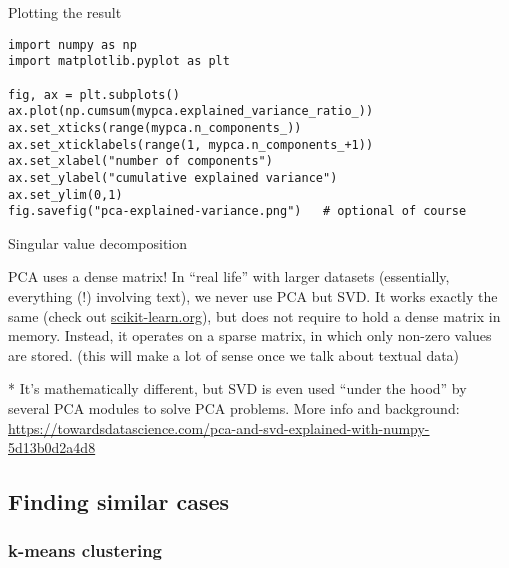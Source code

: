 \begin{frame}{Plotting the result}
  \begin{verbatim}
import numpy as np
import matplotlib.pyplot as plt

fig, ax = plt.subplots()
ax.plot(np.cumsum(mypca.explained_variance_ratio_))
ax.set_xticks(range(mypca.n_components_))
ax.set_xticklabels(range(1, mypca.n_components_+1))
ax.set_xlabel("number of components") 
ax.set_ylabel("cumulative explained variance") 
ax.set_ylim(0,1)
fig.savefig("pca-explained-variance.png")   # optional of course
\end{verbatim}


\end{frame}






\begin{frame}{Singular value decomposition}

\begin{alertblock}{PCA uses a dense matrix!}
In ``real life'' with larger datasets (essentially, everything (!) involving text), we never use PCA but SVD. It works exactly the same (check out \url{scikit-learn.org}), but does not require to hold a dense matrix in memory. Instead, it operates on a sparse matrix, in which only non-zero values are stored. (this will make a lot of sense once we talk about textual data)
\end{alertblock}

  
\footnotesize{
* It's mathematically different, but SVD is even used ``under the hood'' by several PCA modules to solve PCA problems.
More info and background: \url{https://towardsdatascience.com/pca-and-svd-explained-with-numpy-5d13b0d2a4d8}}
\end{frame}







\subsection{Finding similar cases}

\subsubsection{k-means clustering}

